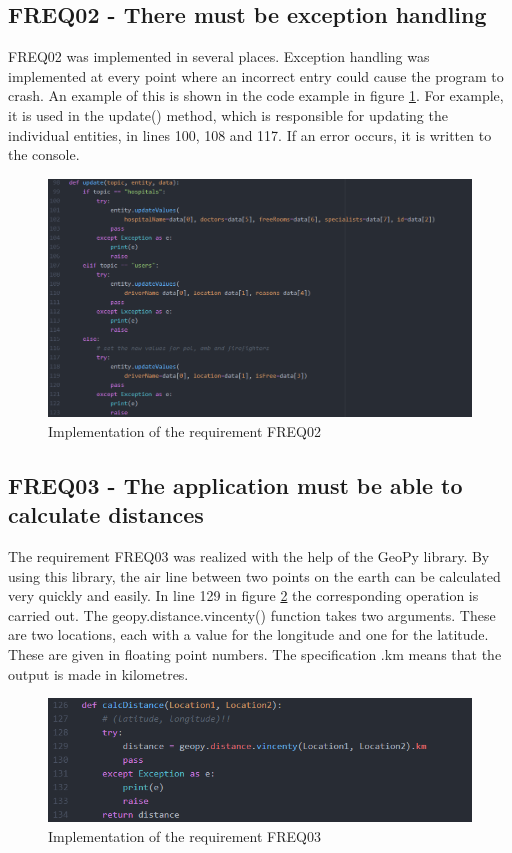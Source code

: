 \subsection{FREQ02 - There must be exception handling}
FREQ02 was implemented in several places. Exception handling was implemented at every point where an incorrect entry could cause the program to crash. An example of this is shown in the code example in figure \ref{FREQ02}. For example, it is used in the update() method, which is responsible for updating the individual entities, in lines 100, 108 and 117. If an error occurs, it is written to the console.

\begin{figure}
\sidecaption
\includegraphics[scale=0.4]{images/walter/code/FREQ02-01.png}
\caption{Implementation of the requirement FREQ02}
\label{FREQ02}
\end{figure}

\subsection{FREQ03 - The application must be able to calculate distances}
The requirement FREQ03 was realized with the help of the GeoPy library. By using this library, the air line between two points on the earth can be calculated very quickly and easily. In line 129 in figure \ref{FREQ03} the corresponding operation is carried out. The geopy.distance.vincenty() function takes two arguments. These are two locations, each with a value for the longitude and one for the latitude. These are given in floating point numbers. The specification .km means that the output is made in kilometres.

\begin{figure}
\sidecaption
\includegraphics[scale=0.4]{images/walter/code/FREQ02-00.png}
\caption{Implementation of the requirement FREQ03}
\label{FREQ03}
\end{figure}

